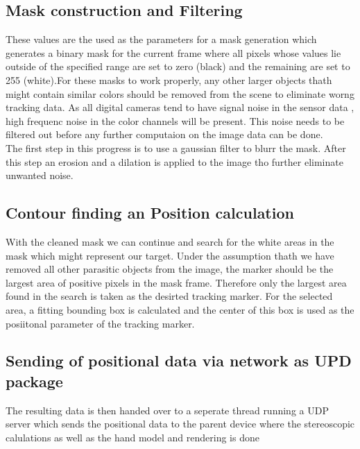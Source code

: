 \subsection{Mask construction and Filtering}
These values are the used as the parameters for a mask generation which generates a binary mask for the current frame where all pixels whose values lie outside of the specified range are set to zero (black) and the remaining are set to 255 (white).For these masks to work properly, any other larger objects thath might contain similar colors should be removed from the scene to eliminate worng tracking data. As all digital cameras tend to have signal noise in the sensor data , high frequenc  noise in the color channels will be present. This noise needs to be filtered out before any further computaion on the image data can be done.\\
The first step in this progress is to use a gaussian filter to blurr the mask. After this step an erosion and a dilation is applied to the image tho further eliminate unwanted noise.
\subsection{Contour finding an Position calculation}
With the cleaned mask we can continue and search for the white areas in the mask which might represent our target. Under the assumption thath we have removed all other parasitic objects from the image, the marker should be the largest area of positive pixels in the mask frame. Therefore only the largest area found in the search is taken as the desirted tracking marker. For the selected area, a fitting bounding box is calculated and the center of this box is used as the posiitonal parameter of the tracking marker.
\subsection{Sending of positional data via network as UPD package}
The resulting data is then handed over to a seperate thread running a UDP server which sends the positional data to the parent device where the stereoscopic calulations as well as the hand model and rendering is done

